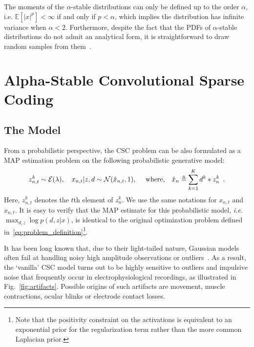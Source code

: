 The moments of the $\alpha$-stable distributions can only be defined up to the order $\alpha$, i.e. $\mathds{E}[|x|^p] < \infty $ if and only if $p <\alpha$, which implies the distribution has infinite variance when $\alpha<2$. Furthermore, despite the fact that the \acp{PDF} of $\alpha$-stable distributions do not admit an analytical form, it is straightforward to draw random samples from them~\citep{chambers1976method}.





\section{Alpha-Stable Convolutional Sparse Coding}

\subsection{The Model}


From a probabilistic perspective, the \ac{CSC} problem can be also formulated as a \ac{MAP} estimation problem on the following probabilistic generative model:
%
\begin{align}
z_{n,t}^k \sim {\cal E}(\lambda),
\quad x_{n,t} | z, d \sim {\cal N}( \hat{x}_{n,t},1 ),
\quad \text{ where,}
\quad \hat{x}_n \triangleq \sum_{k=1}^{K}d^{k} * z_{n}^{k} \enspace .
\label{eqn:csc_prob}
\end{align}
%
Here, $z_{n,t}^k$ denotes the $t$th element of $z_{n}^k$. We use the same notations for $x_{n,t}$ and $\hat{x}_{n,t}$. It is easy to verify that the MAP estimate for this probabilistic model, \textit{i.e.}\ $\max_{d,z} \log p(d,z|x)$, is identical to the original optimization problem defined in~\eqref{eq:problem_definition}\footnote{Note that the positivity constraint on the activations is equivalent to an exponential prior for the regularization term rather than the more common Laplacian prior.}.

It has been long known that, due to their light-tailed nature, Gaussian models often fail at handling noisy high amplitude observations or outliers~\citep{Huber81a}. As a result, the `vanilla' \ac{CSC} model turns out to be highly sensitive to outliers and impulsive noise that frequently occur in electrophysiological recordings, as illustrated in Fig.~\ref{fig:artifacts}. Possible origins of such artifacts are movement, muscle contractions, ocular blinks or electrode contact losses.


